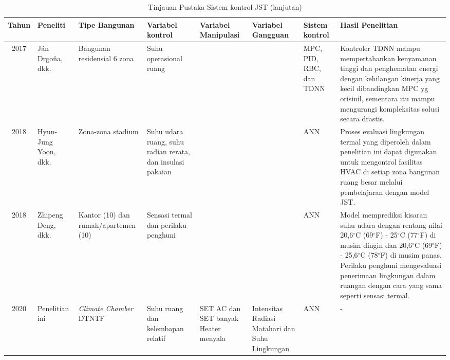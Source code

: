 \begin{landscape}
	\begin{table}[hbt!]
		\caption{Tinjauan Pustaka Sistem kontrol JST (lanjutan)}
		\label{tbl:2:studiANN2}
		\centering
		\begin{tabular}{|c|p{2.8cm}|p{3cm}|p{3cm}|p{3cm}|p{2.8cm}|p{3.5cm}|p{7cm}|}
			\hline
			
			Tahun & Peneliti & Tipe Bangunan & Variabel kontrol & Variabel Manipulasi & Variabel Gangguan & Sistem kontrol & Hasil Penelitian \\ \hline
			
			2017 \cite{article15} & Ján Drgoňa, dkk. & Bangunan residensial 6 zona & Suhu operasional ruang & & & MPC, PID, RBC, dan TDNN & Kontroler TDNN mampu mempertahankan kenyamanan tinggi dan penghematan energi dengan kehilangan kinerja yang kecil dibandingkan MPC yg orisinil, sementara itu mampu mengurangi kompleksitas solusi secara drastis. \\ \hline
			
			2018 \cite{article16} & Hyun-Jung Yoon, dkk. & Zona-zona stadium & Suhu udara ruang, suhu radian rerata, dan insulasi pakaian & & & ANN & Proses evaluasi lingkungan termal yang diperoleh dalam penelitian ini dapat digunakan untuk mengontrol fasilitas HVAC di setiap zona bangunan ruang besar melalui pembelajaran dengan model JST. \\ \hline
			
			2018 \cite{article17} & Zhipeng Deng, dkk. & Kantor (10) dan rumah/apartemen (10) & Sensasi termal dan perilaku penghuni & & & ANN & Model memprediksi kisaran suhu udara dengan rentang nilai 20,6$^{\circ}$C (69$^{\circ}$F) - 25$^{\circ}$C (77$^{\circ}$F) di musim dingin dan 20,6$^{\circ}$C (69$^{\circ}$F) - 25,6$^{\circ}$C (78$^{\circ}$F) di musim panas. Perilaku penghuni mengevaluasi penerimaan lingkungan dalam ruangan dengan cara yang sama seperti sensasi termal.\\ \hline
			
			2020 & Penelitian ini & \textit{Climate Chamber} DTNTF & Suhu ruang dan kelembapan relatif & SET AC dan SET banyak Heater menyala & Intensitas Radiasi Matahari dan Suhu Lingkungan & ANN & - \\ \hline
		\end{tabular}
	\end{table}
\end{landscape}

